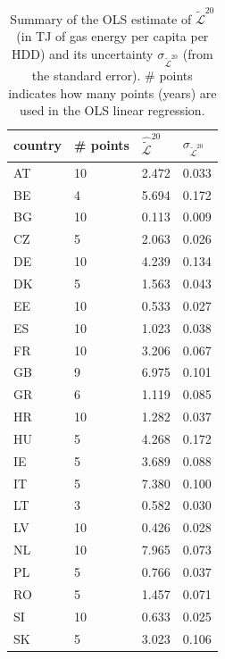 \documentclass[12pt]{article}
\begin{document}
\begin{table}[h!]
\centering
\begin{tabular}{l|lll}
country & \# points & $\hat{\tilde{\mathcal{L}}}^{20}$   & $\sigma_{\tilde{\mathcal{L}}^{20}}$ \\ \hline
AT      & 10        & 2.472 & 0.033    \\
BE      & 4         & 5.694 & 0.172    \\
BG      & 10        & 0.113 & 0.009    \\
CZ      & 5         & 2.063 & 0.026    \\
DE      & 10        & 4.239 & 0.134    \\
DK      & 5         & 1.563 & 0.043    \\
EE      & 10        & 0.533 & 0.027    \\
ES      & 10        & 1.023 & 0.038    \\
FR      & 10        & 3.206 & 0.067    \\
GB      & 9         & 6.975 & 0.101    \\
GR      & 6         & 1.119 & 0.085    \\
HR      & 10        & 1.282 & 0.037    \\
HU      & 5         & 4.268 & 0.172    \\
IE      & 5         & 3.689 & 0.088    \\
IT      & 5         & 7.380 & 0.100    \\
LT      & 3         & 0.582 & 0.030    \\
LV      & 10        & 0.426 & 0.028    \\
NL      & 10        & 7.965 & 0.073    \\
PL      & 5         & 0.766 & 0.037    \\
RO      & 5         & 1.457 & 0.071    \\
SI      & 10        & 0.633 & 0.025    \\
SK      & 5         & 3.023 & 0.106   
\end{tabular}
\caption{Summary of the OLS estimate of $\tilde{\mathcal{L}}^{20}$ (in TJ of gas energy per capita per HDD) and its uncertainty $\sigma_{\tilde{\mathcal{L}}^{20}}$ (from the standard error). \# points indicates how many points (years) are used in the OLS linear regression.} \label{table:L}
\end{table}
\end{document}
